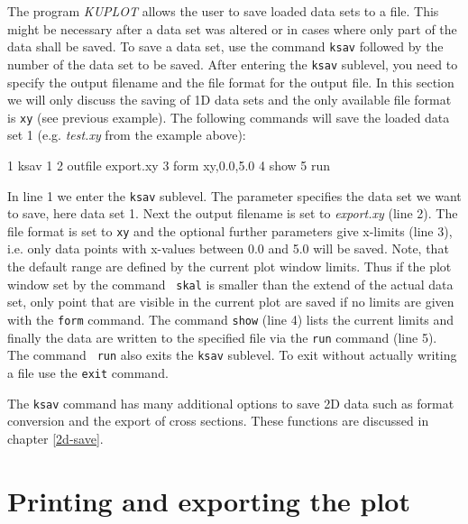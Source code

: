The program {\it KUPLOT} allows the user to save loaded data sets to
a file.  This might be necessary after a data set was altered or in
cases where only part of the data shall be saved.  To save a data
set, use the command {\tt ksav} followed by the number of the data
set to be saved.  After entering the {\tt ksav} sublevel, you need
to specify the output filename and the file format for the output
file. In this section we will only discuss the saving of 1D data
sets and the only available file format is {\tt xy} (see previous
example).  The following commands will save the loaded data set 1
(e.g.  {\it test.xy} from the example above):
%
\begin{MacVerbatim}
     1  ksav 1
     2    outfile export.xy
     3    form xy,0.0,5.0
     4    show
     5  run
\end{MacVerbatim}
%
In line 1 we enter the {\tt ksav} sublevel.  The parameter specifies
the data set we want to save, here data set 1.  Next the output
filename is set to {\it export.xy} (line 2).  The file format is set
to {\tt xy} and the optional further parameters give x-limits (line
3), i.e.  only data points with x-values between 0.0 and 5.0 will be
saved.  Note, that the default range are defined by the current plot
window limits.  Thus if the plot window set by the command {\tt
skal} is smaller than the extend of the actual data set, only point
that are visible in the current plot are saved if no limits are
given with the {\tt form} command.  The command {\tt show} (line 4)
lists the current limits and finally the data are written to the
specified file via the {\tt run} command (line 5).  The command {\tt
run} also exits the {\tt ksav} sublevel.  To exit without actually
writing a file use the {\tt exit} command.  \par

The {\tt ksav} command has many additional options to save 2D data
such as format conversion and the export of cross sections. These
functions are discussed in chapter \ref{2d-save}.


\section{Printing and exporting the plot \label{1d-print}}

